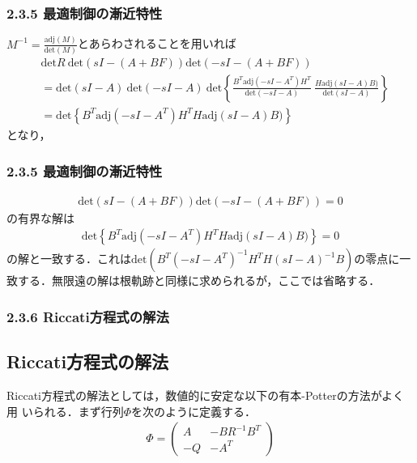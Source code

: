 \begin{frame}[t]
\frametitle{2.3.5 最適制御の漸近特性}
$M^{-1}=\frac{\mbox{adj}(M)}{\mbox{det}(M)}$とあらわされることを用いれば
\begin{align}
	& %
	\mbox{det}R \ \mbox{det}({sI-(A + B F)})\mbox{det}({-sI-(A + B F)})
\nonumber \\
		&= \mbox{det}(sI-A) \ \mbox{det}(-sI-A) \ 
			\mbox{det}\left \{ \frac{B^T \mbox{adj}(-sI - A^T)H^T}{\mbox{det}(-sI-A)}
								\ \frac{H \mbox{adj}(sI - A) B)}{\mbox{det}(sI-A)}  \right \}
\nonumber \\
		&= \mbox{det}\left \{ {B^T \mbox{adj}(-sI - A^T)H^T} {H \mbox{adj}(sI - A) B)} \right \}
\end{align}
となり，
\end{frame}

\begin{frame}[t]
\frametitle{2.3.5 最適制御の漸近特性}
\begin{align}
	\mbox{det}({sI-(A + B F)})\mbox{det}({-sI-(A + B F)})=0
\nonumber
\end{align}
の有界な解は
\begin{align}
	\mbox{det}\left \{ {B^T \mbox{adj}(-sI - A^T)H^T} {H \mbox{adj}(sI - A) B)} \right \}=0
\nonumber
\end{align}
の解と一致する．これは$\mbox{det}( B^T (-sI - A^T)^{-1}H^T H (sI - A)^{-1} B)$の零点に一致する．無限遠の解は根軌跡と同様に求められるが，ここでは省略する．


\end{frame}

\begin{frame}[t]
\frametitle{2.3.6 Riccati方程式の解法}
\subsection{Riccati方程式の解法}

Riccati方程式の解法としては，数値的に安定な以下の有本-Potterの方法がよく用
いられる．まず行列$\Phi$を次のように定義する．
\begin{align}
 \Phi = \left(\begin{array}{cc}
	       A  & - B R^{-1} B^T \\
	       -Q & - A^T
	      \end{array}\right)
\end{align}
\end{frame}

